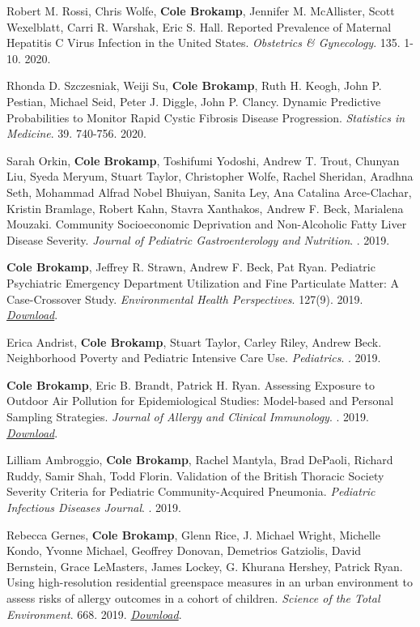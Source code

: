Robert M. Rossi, Chris Wolfe, \textbf{Cole Brokamp}, Jennifer M.
McAllister, Scott Wexelblatt, Carri R. Warshak, Eric S. Hall. Reported
Prevalence of Maternal Hepatitis C Virus Infection in the United States.
\emph{Obstetrics \& Gynecology}. 135. 1-10. 2020.

Rhonda D. Szczesniak, Weiji Su, \textbf{Cole Brokamp}, Ruth H. Keogh,
John P. Pestian, Michael Seid, Peter J. Diggle, John P. Clancy. Dynamic
Predictive Probabilities to Monitor Rapid Cystic Fibrosis Disease
Progression. \emph{Statistics in Medicine}. 39. 740-756. 2020.

Sarah Orkin, \textbf{Cole Brokamp}, Toshifumi Yodoshi, Andrew T. Trout,
Chunyan Liu, Syeda Meryum, Stuart Taylor, Christopher Wolfe, Rachel
Sheridan, Aradhna Seth, Mohammad Alfrad Nobel Bhuiyan, Sanita Ley, Ana
Catalina Arce-Clachar, Kristin Bramlage, Robert Kahn, Stavra Xanthakos,
Andrew F. Beck, Marialena Mouzaki. Community Socioeconomic Deprivation
and Non-Alcoholic Fatty Liver Disease Severity. \emph{Journal of
Pediatric Gastroenterology and Nutrition}. . 2019.

\textbf{Cole Brokamp}, Jeffrey R. Strawn, Andrew F. Beck, Pat Ryan.
Pediatric Psychiatric Emergency Department Utilization and Fine
Particulate Matter: A Case-Crossover Study. \emph{Environmental Health
Perspectives}. 127(9). 2019.
\href{https://s3.amazonaws.com/colebrokamp-website/publications/Brokamp_EHP_2019.pdf}{\emph{Download}}.

Erica Andrist, \textbf{Cole Brokamp}, Stuart Taylor, Carley Riley,
Andrew Beck. Neighborhood Poverty and Pediatric Intensive Care Use.
\emph{Pediatrics}. . 2019.

\textbf{Cole Brokamp}, Eric B. Brandt, Patrick H. Ryan. Assessing
Exposure to Outdoor Air Pollution for Epidemiological Studies:
Model-based and Personal Sampling Strategies. \emph{Journal of Allergy
and Clinical Immunology}. . 2019.
\href{https://colebrokamp-website.s3.amazonaws.com/publications/Brokamp_JACI_2019.pdf}{\emph{Download}}.

Lilliam Ambroggio, \textbf{Cole Brokamp}, Rachel Mantyla, Brad DePaoli,
Richard Ruddy, Samir Shah, Todd Florin. Validation of the British
Thoracic Society Severity Criteria for Pediatric Community-Acquired
Pneumonia. \emph{Pediatric Infectious Diseases Journal}. . 2019.

Rebecca Gernes, \textbf{Cole Brokamp}, Glenn Rice, J. Michael Wright,
Michelle Kondo, Yvonne Michael, Geoffrey Donovan, Demetrios Gatziolis,
David Bernstein, Grace LeMasters, James Lockey, G. Khurana Hershey,
Patrick Ryan. Using high-resolution residential greenspace measures in
an urban environment to assess risks of allergy outcomes in a cohort of
children. \emph{Science of the Total Environment}. 668. 2019.
\href{https://colebrokamp-website.s3.amazonaws.com/publications/Gernes-Using\%20high-resolution\%20residential\%20greenspace\%20measures\%20in\%20an\%20urban\%20environment\%20to\%20assess\%20risks\%20of\%20allergy\%20outcomes\%20in\%20children-STE2019.pdf}{\emph{Download}}.

